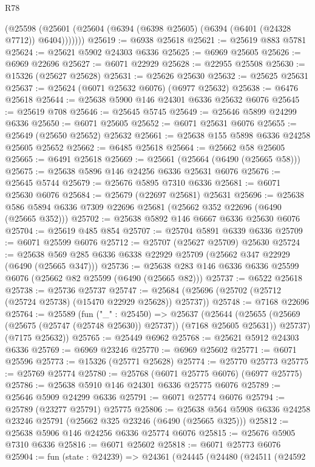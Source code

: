 \begin{lexlean}{R78}
\begin{coremodule}
        (@25598 (@25601 (@25604 (@6394 (@6398 @25605) (@6394 (@6401 (@24328 @7712)) @6404)))))))
@25619 := @6938 @25618
@25621 := @25619 @883 @5781
@25624 := @25621 @5902 @24303 @6336
@25625 := @6969 @25605
@25626 := @6969 @22696
@25627 := @6071 @22929
@25628 := @22955 @25508
@25630 := @15326 (@25627 @25628)
@25631 := @25626 @25630
@25632 := @25625 @25631
@25637 := @25624 (@6071 @25632 @6076) (@6977 @25632)
@25638 := @6476 @25618
@25644 := @25638 @5900 @146 @24301 @6336 @25632 @6076
@25645 := @25619 @708
@25646 := @25645 @5745
@25649 := @25646 @5899 @24299 @6336
@25650 := @6071 @25605
@25652 := @6071 @25631 @6076
@25655 := @25649 (@25650 @25652) @25632
@25661 := @25638 @155 @5898 @6336 @24258 @25605 @25652
@25662 := @6485 @25618
@25664 := @25662 @58 @25605
@25665 := @6491 @25618
@25669 := @25661 (@25664 (@6490 (@25665 @58)))
@25675 := @25638 @5896 @146 @24256 @6336 @25631 @6076
@25676 := @25645 @5744
@25679 := @25676 @5895 @7310 @6336
@25681 := @6071 @25630 @6076
@25684 := @25679 (@22697 @25681) @25631
@25696 := @25638 @586 @5894 @6336 @7309 @22696 @25681 (@25662 @352 @22696 (@6490 (@25665 @352)))
@25702 := @25638 @5892 @146 @6667 @6336 @25630 @6076
@25704 := @25619 @485 @854
@25707 := @25704 @5891 @6339 @6336
@25709 := @6071 @25599 @6076
@25712 := @25707 (@25627 @25709) @25630
@25724 := @25638 @569 @285 @6336 @6338 @22929 @25709 (@25662 @347 @22929 (@6490 (@25665 @347)))
@25736 := @25638 @283 @146 @6336 @6336 @25599 @6076 (@25662 @82 @25599 (@6490 (@25665 @82)))
@25737 := @6522 @25618
@25738 := @25736 @25737
@25747 := @25684 (@25696 (@25702 (@25712 (@25724 @25738) (@15470 @22929 @25628)) @25737))
@25748 := @7168 @22696
@25764 := @25589
    (fun ("_" : @25450) =>
    @25637
      (@25644
        (@25655 (@25669 (@25675 (@25747 (@25748 @25630)) @25737)) (@7168 @25605 @25631))
        @25737)
      (@7175 @25632))
@25765 := @25449 @6962
@25768 := @25621 @5912 @24303 @6336
@25769 := @6969 @23246
@25770 := @6969 @25602
@25771 := @6071 @25596
@25773 := @15326 (@25771 @25628)
@25774 := @25770 @25773
@25775 := @25769 @25774
@25780 := @25768 (@6071 @25775 @6076) (@6977 @25775)
@25786 := @25638 @5910 @146 @24301 @6336 @25775 @6076
@25789 := @25646 @5909 @24299 @6336
@25791 := @6071 @25774 @6076
@25794 := @25789 (@23277 @25791) @25775
@25806 := @25638 @564 @5908 @6336 @24258 @23246 @25791 (@25662 @325 @23246 (@6490 (@25665 @325)))
@25812 := @25638 @5906 @146 @24256 @6336 @25774 @6076
@25815 := @25676 @5905 @7310 @6336
@25816 := @6071 @25602
@25818 := @6071 @25773 @6076
@25904 := fun (state : @24239) =>
  @24361
    (@24445
      (@24480
        (@24511
          (@24592

\end{coremodule}
\end{lexlean}
